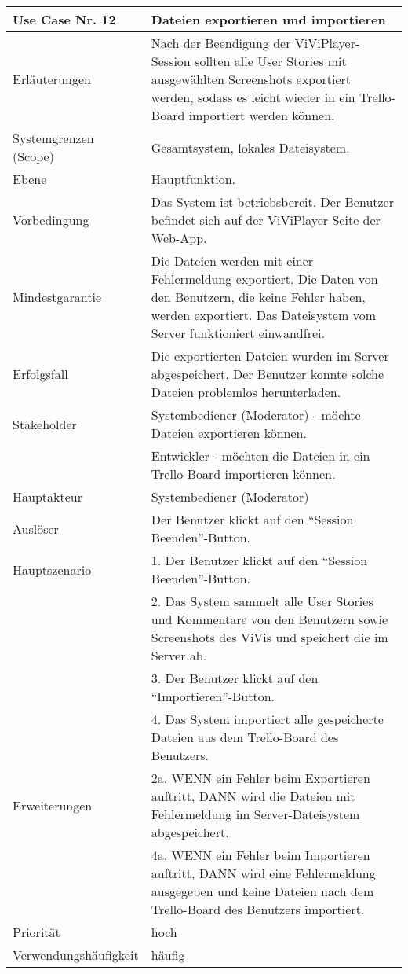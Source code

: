 \begin{tabularx}{\linewidth}{|l|X|}
	\hline
	Use Case Nr. 12			& \textbf{Dateien exportieren und importieren} \\ \hline
	Erläuterungen			& Nach der Beendigung der ViViPlayer-Session sollten alle User Stories mit 
							  ausgewählten Screenshots exportiert werden, sodass es leicht wieder in ein Trello-Board importiert werden können. \\ \hline
	Systemgrenzen (Scope)	& Gesamtsystem, lokales Dateisystem. \\ \hline
	Ebene					& Hauptfunktion. \\ \hline
	Vorbedingung			& Das System ist betriebsbereit. Der Benutzer befindet sich auf der 
							  ViViPlayer-Seite der Web-App. \\ \hline
	Mindestgarantie			& Die Dateien werden mit einer Fehlermeldung exportiert. Die 
							  Daten von den Benutzern, die keine Fehler haben, werden exportiert. Das Dateisystem vom Server funktioniert einwandfrei.\\ \hline
	Erfolgsfall				& Die exportierten Dateien wurden im Server abgespeichert. Der 
							  Benutzer konnte solche Dateien problemlos herunterladen. \\ \hline
	Stakeholder				& Systembediener (Moderator) - möchte Dateien exportieren können. \\ 
							& Entwickler - möchten die Dateien in ein Trello-Board importieren können. \\ \hline
	Hauptakteur				& Systembediener (Moderator) \\ \hline
	Auslöser				& Der Benutzer klickt auf den ``Session Beenden''-Button. \\ \hline	
	Hauptszenario			& 1. Der Benutzer klickt auf den ``Session Beenden''-Button. \\
							& 2. Das System sammelt alle User Stories und Kommentare von den 
							  Benutzern sowie Screenshots des ViVis und speichert die im Server ab. \\
							& 3. Der Benutzer klickt auf den ``Importieren''-Button. \\
							& 4. Das System importiert alle gespeicherte Dateien aus dem Trello-Board des
							  Benutzers. \\ \hline
	Erweiterungen			& 2a. WENN ein Fehler beim Exportieren auftritt, DANN wird die Dateien mit 
							  Fehlermeldung im Server-Dateisystem abgespeichert. \\ 
							& 4a. WENN ein Fehler beim Importieren auftritt, DANN wird eine Fehlermeldung 
							  ausgegeben und keine Dateien nach dem Trello-Board des Benutzers importiert. 
							  \\ \hline
	Priorität				& hoch \\ \hline
	Verwendungshäufigkeit	& häufig \\ \hline
\end{tabularx}

